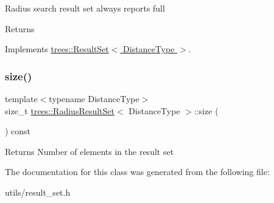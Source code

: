 Radius search result set always reports full \begin{DoxyReturn}{Returns}

\end{DoxyReturn}


Implements \hyperlink{classtrees_1_1_result_set}{trees\+::\+Result\+Set$<$ Distance\+Type $>$}.

\mbox{\label{classtrees_1_1_radius_result_set_a4ac769fcfb64d84d46d0eb233d4681da}} 
\subsubsection{\texorpdfstring{size()}{size()}}
{\footnotesize\ttfamily template$<$typename Distance\+Type$>$ \\
size\+\_\+t \hyperlink{classtrees_1_1_radius_result_set}{trees\+::\+Radius\+Result\+Set}$<$ Distance\+Type $>$\+::size (\begin{DoxyParamCaption}{ }\end{DoxyParamCaption}) const\hspace{0.3cm}{\ttfamily [inline]}}

\begin{DoxyReturn}{Returns}
Number of elements in the result set 
\end{DoxyReturn}


The documentation for this class was generated from the following file\+:\begin{DoxyCompactItemize}
\item 
utils/result\+\_\+set.\+h\end{DoxyCompactItemize}
